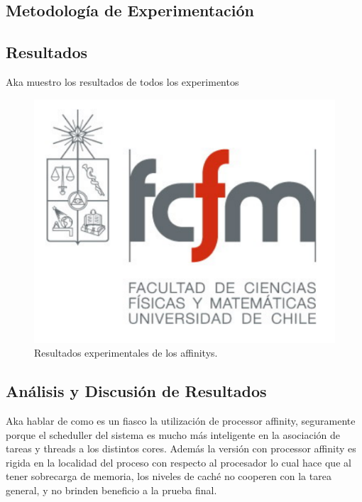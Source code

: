 \subsection{Metodología de Experimentación}

\subsection{Resultados}

Aka muestro los resultados de todos los experimentos
\begin{figure}[!h]
	\centering
	\includegraphics[scale=.7]{imagenes/fcfm}
	\caption{Resultados experimentales de los affinitys.}
	\label{fig:resAffinity}
\end{figure}

\subsection{Análisis y Discusión de Resultados}
Aka hablar de como es un fiasco la utilización de processor affinity, seguramente porque el scheduller del sistema es mucho más inteligente en la asociación de tareas y threads a los distintos cores. Además la versión con processor affinity es rigida en la localidad del proceso con respecto al procesador lo cual hace que al tener sobrecarga de memoria, los niveles de caché no cooperen con la tarea general, y no brinden beneficio a la prueba final.

